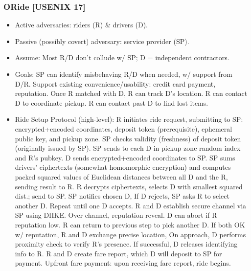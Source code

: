 \documentclass{build/llncs}
\begin{document}
\subsubsection{ORide [USENIX 17]}
\begin{itemize}
\item Active adversaries: riders (R) \& drivers (D).
\item Passive (possibly covert) adversary: service provider (SP).
\item Assume: Most R/D don't collude w/ SP;
D = independent contractors.
\item Goals:
\subitem SP can identify misbehaving R/D when needed, w/ support from D/R.
\subitem Support existing convenience/usability: credit card payment, reputation.
\subitem Once R matched with D, R can track D's location. R can contact D to coordinate
pickup. R can contact past D to find lost items.
\item Ride Setup Protocol (high-level):
\subitem R initiates ride request, submitting to SP: encrypted+encoded coordinates, deposit
token (prerequisite), ephemeral public key, and pickup zone.
\subitem SP checks validity (freshness) of deposit token (originally issued by SP).
\subitem SP sends to each D in pickup zone random index and R's pubkey.
\subitem D sends encrypted+encoded coordinates to SP.
\subitem SP sums drivers' ciphertexts (somewhat homomorphic encryption) and computes packed
squared values of Euclidean distances between all D and the R, sending result to R.
\subitem R decrypts ciphertexts, selects D with smallest squared dist.; send to SP.
\subitem SP notifies chosen D, If D rejects, SP asks R to select another D. Repeat until one D
accepts.
\subitem R and D establish secure channel via SP using DHKE. Over channel, reputation reveal.
D can abort if R reputation low. R can return to previous step to pick another D.
\subitem If both OK w/ reputation, R and D exchange precise location,
\subitem On approach, D performs proximity check to verify R's presence.
If successful, D releases identifying info to R.
\subitem R and D create fare report, which D will deposit to SP for payment. Upfront
fare payment: upon receiving fare report, ride begins.
\end{itemize}
\end{document}
